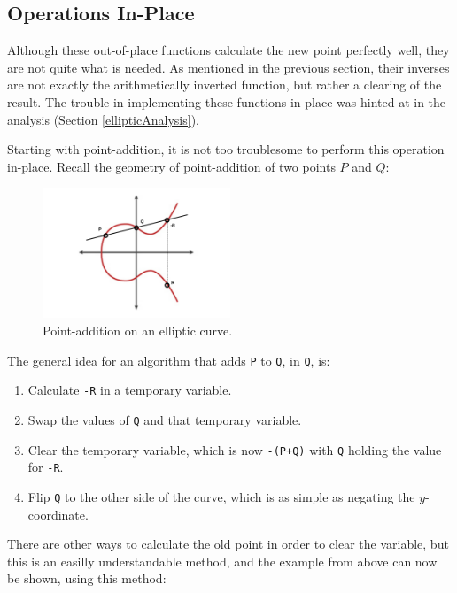 \subsection{Operations In-Place}
\label{In-Place}
Although these out-of-place functions calculate the new point perfectly well, they are not quite what is needed. As mentioned in the previous section, their inverses are not exactly the arithmetically inverted function, but rather a clearing of the result. The trouble in implementing these functions in-place was hinted at in the analysis (Section \ref{ellipticAnalysis}).

Starting with point-addition, it is not too troublesome to perform this operation in-place. Recall the geometry of point-addition of two points $P$ and $Q$:
\begin{figure}[H]
    \centering
    \includegraphics[width=0.5\textwidth]{figures/EcAdd}
    \caption{Point-addition on an elliptic curve.}
\end{figure}
The general idea for an algorithm that adds \texttt{P} to \texttt{Q}, in \texttt{Q}, is:
\begin{enumerate}[1)]
\item Calculate \texttt{-R} in a temporary variable.
\item Swap the values of \texttt{Q} and that temporary variable.
\item Clear the temporary variable, which is now \texttt{-(P+Q)} with \texttt{Q} holding the value for \texttt{-R}.
\item Flip \texttt{Q} to the other side of the curve, which is as simple as negating the $y$-coordinate.
\end{enumerate}
There are other ways to calculate the old point in order to clear the variable, but this is an easilly understandable method, and the example from above can now be shown, using this method:

